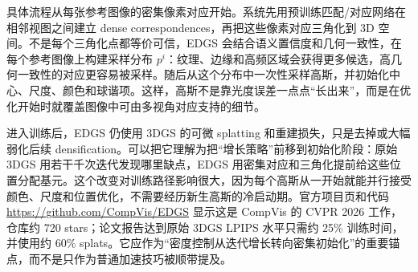 具体流程从每张参考图像的密集像素对应开始。系统先用预训练匹配/对应网络在相邻视图之间建立 dense correspondences，再把这些像素对应三角化到 3D 空间。不是每个三角化点都等价可信，EDGS 会结合语义置信度和几何一致性，在每个参考图像上构建采样分布 $p^i$：纹理、边缘和高频区域会获得更多候选，高几何一致性的对应更容易被采样。随后从这个分布中一次性采样高斯，并初始化中心、尺度、颜色和球谐项。这样，高斯不是靠光度误差一点点“长出来”，而是在优化开始时就覆盖图像中可由多视角对应支持的细节。

进入训练后，EDGS 仍使用 3DGS 的可微 splatting 和重建损失，只是去掉或大幅弱化后续 densification。可以把它理解为把“增长策略”前移到初始化阶段：原始 3DGS 用若干千次迭代发现哪里缺点，EDGS 用密集对应和三角化提前给这些位置分配基元。这个改变对训练路径影响很大，因为每个高斯从一开始就能并行接受颜色、尺度和位置优化，不需要经历新生高斯的冷启动期。官方项目页和代码 \url{https://github.com/CompVis/EDGS} 显示这是 CompVis 的 CVPR 2026 工作，仓库约 720 stars；论文报告达到原始 3DGS LPIPS 水平只需约 25\% 训练时间，并使用约 60\% splats。它应作为“密度控制从迭代增长转向密集初始化”的重要锚点，而不是只作为普通加速技巧被顺带提及。


